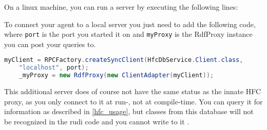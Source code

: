 On a linux machine, you can run a server by executing the following lines:

To connect your \vonda agent to a local server you just need to add the following code, where \texttt{port} is the port you started it on and \texttt{myProxy} is the RdfProxy instance you can post your queries to.

\begin{center}
	\begin{lstlisting}[language=Java]
	myClient = RPCFactory.createSyncClient(HfcDbService.Client.class,
	"localhost", port);
	_myProxy = new RdfProxy(new ClientAdapter(myClient));
	\end{lstlisting}
\end{center}

This additional server does of course not have the same status as the innate HFC proxy, as you only connect to it at run-, not at compile-time. You can query it for information as described in \ref{hfc_usage}, but classes from this database will not be recognized in the rudi code and you cannot write to it . 
